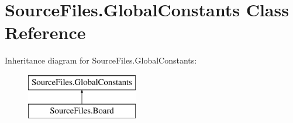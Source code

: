 \hypertarget{class_source_files_1_1_global_constants}{}\section{Source\+Files.\+Global\+Constants Class Reference}
\label{class_source_files_1_1_global_constants}
Inheritance diagram for Source\+Files.\+Global\+Constants\+:\begin{figure}[H]
\begin{center}
\leavevmode
\includegraphics[height=2.000000cm]{class_source_files_1_1_global_constants}
\end{center}
\end{figure}
